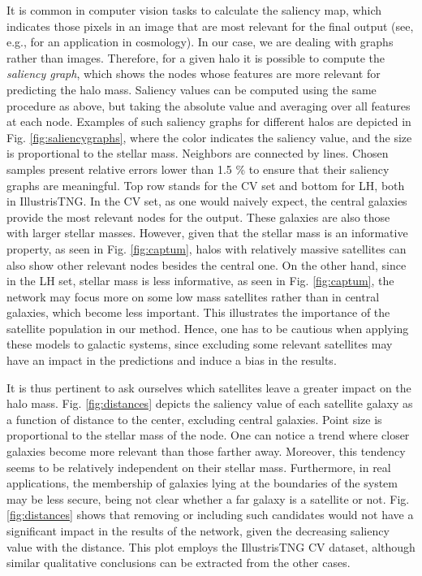\documentclass[twocolumn]{aastex631}
\begin{document}
It is common in computer vision tasks to calculate the saliency map, which indicates those pixels in an image that are most relevant for the final output (see, e.g., \citealt{2021ApJ...907...44V} for an application in cosmology). In our case, we are dealing with graphs rather than images. Therefore, for a given halo it is possible to compute the \textit{saliency graph}, which shows the nodes whose features are more relevant for predicting the halo mass. Saliency values can be computed using the same procedure as above, but taking the absolute value and averaging over all features at each node. Examples of such saliency graphs for different halos are depicted in Fig. \ref{fig:saliencygraphs}, where the color indicates the saliency value, and the size is proportional to the stellar mass. Neighbors are connected by lines. Chosen samples present relative errors lower than 1.5 \% to ensure that their saliency graphs are meaningful. Top row stands for the CV set and bottom for LH, both in IllustrisTNG. In the CV set, as one would naively expect, the central galaxies provide the most relevant nodes for the output. These galaxies are also those with larger stellar masses. However, given that the stellar mass is an informative property, as seen in Fig. \ref{fig:captum}, halos with relatively massive satellites can also show other relevant nodes besides the central one. On the other hand, since in the LH set, stellar mass is less informative, as seen in Fig. \ref{fig:captum}, the network may focus more on some low mass satellites rather than in central galaxies, which become less important. This illustrates the importance of the satellite population in our method. Hence, one has to be cautious when applying these models to galactic systems, since excluding some relevant satellites may have an impact in the predictions and induce a bias in the results.


It is thus pertinent to ask ourselves which satellites leave a greater impact on the halo mass. Fig. \ref{fig:distances} depicts the saliency value of each satellite galaxy as a function of distance to the center, excluding central galaxies. Point size is proportional to the stellar mass of the node. One can notice a trend where closer galaxies become more relevant than those farther away. Moreover, this tendency seems to be relatively independent on their stellar mass. Furthermore, in real applications, the membership of galaxies lying at the boundaries of the system may be less secure, being not clear whether a far galaxy is a satellite or not. Fig. \ref{fig:distances} shows that removing or including such candidates would not have a significant impact in the results of the network, given the decreasing saliency value with the distance. This plot employs the IllustrisTNG CV dataset, although similar qualitative conclusions can be extracted from the other cases.
\end{document}
